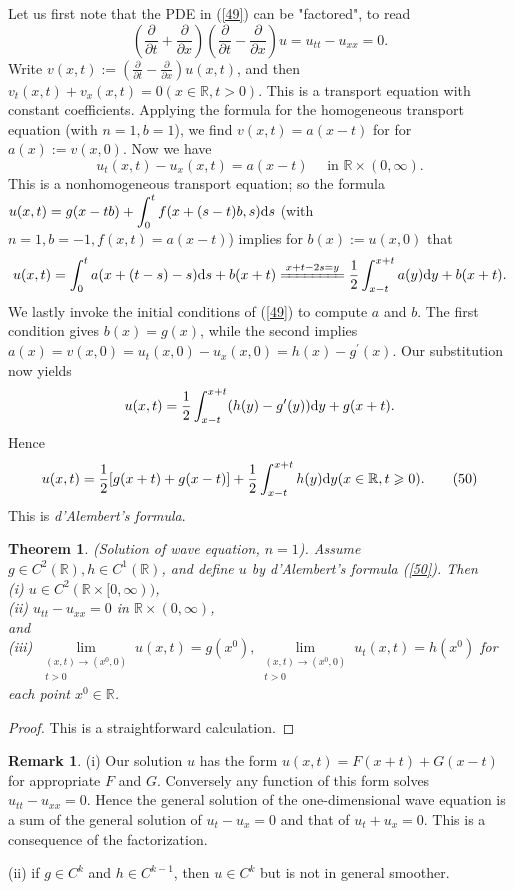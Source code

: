 \documentclass[hyperref,UTF8,12pt]{article}
\numberwithin{equation}{subsection}
\theoremstyle{plain}
\newtheorem{theorem}{Theorem}
\theoremstyle{definition}
\newtheorem{remark}{Remark}
\numberwithin{theorem}{section}
\numberwithin{lemma}{section}
\numberwithin{proposition}{section}
\numberwithin{remark}{section}
\numberwithin{corollary}{section}
\numberwithin{definition}{section}
\numberwithin{problem}{section}
\numberwithin{example}{section}
\def\dif{\textup{d}}
\newcommand{\dis}{\displaystyle}
\newcommand{\limls}{\lim\limits}
\newcommand{\ptl}{\partial}
\newcommand{\mr}{\mathbb{R}}
\renewcommand{\geq}{\geqslant}
\begin{document}
Let us first note that the PDE in (\ref{49}) can be "factored", to read
\[\left(\frac{\ptl}{\ptl t}+\frac{\ptl}{\ptl x}\right)\left(\frac{\ptl}{\ptl t}-\frac{\ptl}{\ptl x}\right)u=u_{tt}-u_{xx}=0.\]Write $v(x,t):=\dis\left(\frac{\ptl}{\ptl t}-\frac{\ptl}{\ptl x}\right)u(x,t)$, and then $v_t(x,t)+v_x(x,t)=0(x\in\mr,t>0)$. This is a transport equation with constant coefficients. Applying the formula for the homogeneous transport equation (with $n=1,b=1$), we find $v(x,t)=a(x-t)$ for for $a(x):=v(x,0)$. Now we have \[u_t(x,t)-u_x(x,t)
=a(x-t)\quad\text{ in } \mr\times(0,\infty).\]This is a nonhomogeneous transport equation; so the formula $u(x,t)=g(x-tb)+\dis\int_0^tf(x+(s-t)b,s)\dif s$ (with $n=1,b=-1,f(x,t)=a(x-t)$) implies for $b(x):=u(x,0)$ that\[u(x,t)=\int_0^ta(x+(t-s)-s)\dif s+
b(x+t)\xlongequal{x+t-2s=y}\frac{1}{2}\int_{x-t}^{x+t}a(y)\dif y+b(x+t).\]We lastly invoke the initial conditions of (\ref{49}) to compute $a$ and $b$. The first condition gives $b(x)=g(x)$, while the second implies $a(x)=v(x,0)=u_t(x,0)-u_x(x,0)=h(x)-g^\prime(x)$. Our substitution now yields\[u(x,t)=\frac{1}{2}\int_{x-t}^{x+t}(h(y)-g^\prime(y))\dif y+g(x+t).\]Hence\[u(x,t)=\frac{1}{2}[g(x+t)+g(x-t)]+\frac{1}{2}\int_{x-t}^{x+t}h(y)\dif y(x\in \mr,t\geq0).\tag{50}\label{50}\]This is \emph{d'Alembert's formula}.
\begin{theorem}
(Solution of wave equation, $n=1$). Assume $g\in C^2(\mr),h\in C^1(\mr)$, and define $u$ by d'Alembert's formula \textup{(\ref{50})}. Then\\
\textup{(i)} $u\in C^2(\mr\times[0,\infty))$,\\
\textup{(ii)} $u_{tt}-u_{xx}=0$ in $\mr\times(0,\infty)$,\\
and\\
\textup{(iii)} $\limls_{\substack{(x,t)\to(x^0,0)\\t>0}}u(x,t)=g(x^0),\limls_{\substack{(x,t)\to(x^0,0)\\t>0}}u_t(x,t)=h(x^0)$ for each point $x^0\in\mr$.
\end{theorem}
\begin{proof}
This is a straightforward calculation.
\end{proof}
\begin{remark}
(i) Our solution $u$ has the form $u(x,t)=F(x+t)+G(x-t)$ for appropriate $F$ and $G$. Conversely any function of this form solves $u_{tt}-u_{xx}=0$. Hence the general solution of the one-dimensional wave equation is a sum of the general solution of $u_t-u_x=0$ and that of $u_t+u_x=0$. This is a consequence of the factorization.

(ii) if $g\in C^k$ and $h\in C^{k-1}$, then $u\in C^k$ but is not in general smoother.
\end{remark}
\end{document}
